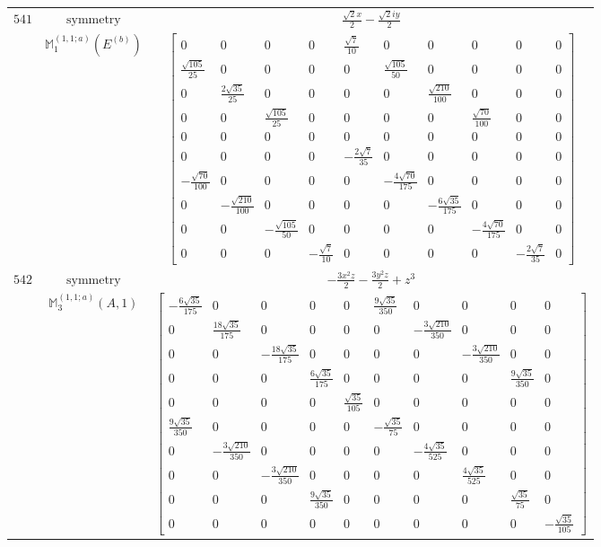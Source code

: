 \documentclass[fleqn,8pt,landscape]{jsarticle}
\begin{document}
\begin{longtable}{ccc}
$ 541 $ & $ \text{symmetry} $ & $ \frac{\sqrt{2} x}{2} - \frac{\sqrt{2} i y}{2} $ \\
$  $ & $ \mathbb{M}_{1}^{(1,1;a)}(E^{(b)}) $ & $ \begin{bmatrix} 0 & 0 & 0 & 0 & \frac{\sqrt{7}}{10} & 0 & 0 & 0 & 0 & 0 \\ \frac{\sqrt{105}}{25} & 0 & 0 & 0 & 0 & \frac{\sqrt{105}}{50} & 0 & 0 & 0 & 0 \\ 0 & \frac{2 \sqrt{35}}{25} & 0 & 0 & 0 & 0 & \frac{\sqrt{210}}{100} & 0 & 0 & 0 \\ 0 & 0 & \frac{\sqrt{105}}{25} & 0 & 0 & 0 & 0 & \frac{\sqrt{70}}{100} & 0 & 0 \\ 0 & 0 & 0 & 0 & 0 & 0 & 0 & 0 & 0 & 0 \\ 0 & 0 & 0 & 0 & - \frac{2 \sqrt{7}}{35} & 0 & 0 & 0 & 0 & 0 \\ - \frac{\sqrt{70}}{100} & 0 & 0 & 0 & 0 & - \frac{4 \sqrt{70}}{175} & 0 & 0 & 0 & 0 \\ 0 & - \frac{\sqrt{210}}{100} & 0 & 0 & 0 & 0 & - \frac{6 \sqrt{35}}{175} & 0 & 0 & 0 \\ 0 & 0 & - \frac{\sqrt{105}}{50} & 0 & 0 & 0 & 0 & - \frac{4 \sqrt{70}}{175} & 0 & 0 \\ 0 & 0 & 0 & - \frac{\sqrt{7}}{10} & 0 & 0 & 0 & 0 & - \frac{2 \sqrt{7}}{35} & 0 \end{bmatrix} $ \\ \hline
$ 542 $ & $ \text{symmetry} $ & $ - \frac{3 x^{2} z}{2} - \frac{3 y^{2} z}{2} + z^{3} $ \\
$  $ & $ \mathbb{M}_{3}^{(1,1;a)}(A,1) $ & $ \begin{bmatrix} - \frac{6 \sqrt{35}}{175} & 0 & 0 & 0 & 0 & \frac{9 \sqrt{35}}{350} & 0 & 0 & 0 & 0 \\ 0 & \frac{18 \sqrt{35}}{175} & 0 & 0 & 0 & 0 & - \frac{3 \sqrt{210}}{350} & 0 & 0 & 0 \\ 0 & 0 & - \frac{18 \sqrt{35}}{175} & 0 & 0 & 0 & 0 & - \frac{3 \sqrt{210}}{350} & 0 & 0 \\ 0 & 0 & 0 & \frac{6 \sqrt{35}}{175} & 0 & 0 & 0 & 0 & \frac{9 \sqrt{35}}{350} & 0 \\ 0 & 0 & 0 & 0 & \frac{\sqrt{35}}{105} & 0 & 0 & 0 & 0 & 0 \\ \frac{9 \sqrt{35}}{350} & 0 & 0 & 0 & 0 & - \frac{\sqrt{35}}{75} & 0 & 0 & 0 & 0 \\ 0 & - \frac{3 \sqrt{210}}{350} & 0 & 0 & 0 & 0 & - \frac{4 \sqrt{35}}{525} & 0 & 0 & 0 \\ 0 & 0 & - \frac{3 \sqrt{210}}{350} & 0 & 0 & 0 & 0 & \frac{4 \sqrt{35}}{525} & 0 & 0 \\ 0 & 0 & 0 & \frac{9 \sqrt{35}}{350} & 0 & 0 & 0 & 0 & \frac{\sqrt{35}}{75} & 0 \\ 0 & 0 & 0 & 0 & 0 & 0 & 0 & 0 & 0 & - \frac{\sqrt{35}}{105} \end{bmatrix} $ \\ \hline

\end{longtable}
\end{document}
